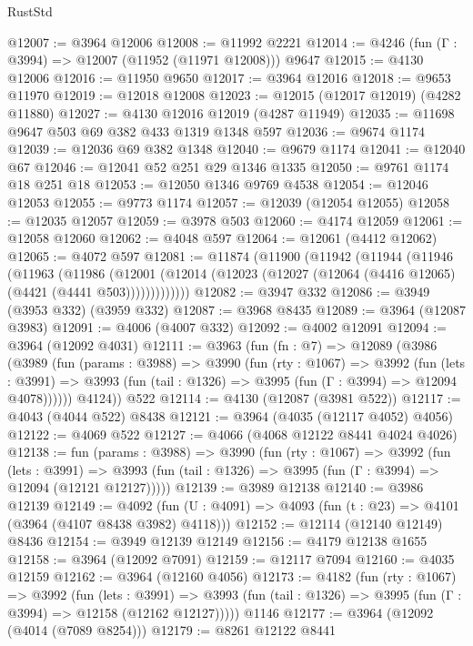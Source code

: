 \begin{lexlean}{RustStd}
\begin{coremodule}
@12007 := @3964 @12006
@12008 := @11992 @2221
@12014 := @4246 (fun (Γ : @3994) => @12007 (@11952 (@11971 @12008))) @9647
@12015 := @4130 @12006
@12016 := @11950 @9650
@12017 := @3964 @12016
@12018 := @9653 @11970
@12019 := @12018 @12008
@12023 := @12015 (@12017 @12019) (@4282 @11880)
@12027 := @4130 @12016 @12019 (@4287 @11949)
@12035 := @11698 @9647 @503 @69 @382 @433 @1319 @1348 @597
@12036 := @9674 @1174
@12039 := @12036 @69 @382 @1348
@12040 := @9679 @1174
@12041 := @12040 @67
@12046 := @12041 @52 @251 @29 @1346 @1335
@12050 := @9761 @1174 @18 @251 @18
@12053 := @12050 @1346 @9769 @4538
@12054 := @12046 @12053
@12055 := @9773 @1174
@12057 := @12039 (@12054 @12055)
@12058 := @12035 @12057
@12059 := @3978 @503
@12060 := @4174 @12059
@12061 := @12058 @12060
@12062 := @4048 @597
@12064 := @12061 (@4412 @12062)
@12065 := @4072 @597
@12081 := @11874
    (@11900
      (@11942
        (@11944
          (@11946
            (@11963
              (@11986
                (@12001
                  (@12014 (@12023 (@12027 (@12064 (@4416 @12065) (@4421 (@4441 @503)))))))))))))
@12082 := @3947 @332
@12086 := @3949 (@3953 @332) (@3959 @332)
@12087 := @3968 @8435
@12089 := @3964 (@12087 @3983)
@12091 := @4006 (@4007 @332)
@12092 := @4002 @12091
@12094 := @3964 (@12092 @4031)
@12111 := @3963
    (fun (fn : @7) =>
    @12089
      (@3986
        (@3989
          (fun (params : @3988) =>
          @3990
            (fun (rty : @1067) =>
            @3992
              (fun (lets : @3991) =>
              @3993 (fun (tail : @1326) => @3995 (fun (Γ : @3994) => @12094 @4078))))))
        @4124))
    @522
@12114 := @4130 (@12087 (@3981 @522))
@12117 := @4043 (@4044 @522) @8438
@12121 := @3964 (@4035 (@12117 @4052) @4056)
@12122 := @4069 @522
@12127 := @4066 (@4068 @12122 @8441 @4024 @4026)
@12138 := fun (params : @3988) =>
  @3990
    (fun (rty : @1067) =>
    @3992
      (fun (lets : @3991) =>
      @3993 (fun (tail : @1326) => @3995 (fun (Γ : @3994) => @12094 (@12121 @12127)))))
@12139 := @3989 @12138
@12140 := @3986 @12139
@12149 := @4092
    (fun (U : @4091) => @4093 (fun (t : @23) => @4101 (@3964 (@4107 @8438 @3982) @4118)))
@12152 := @12114 (@12140 @12149) @8436
@12154 := @3949 @12139 @12149
@12156 := @4179 @12138 @1655
@12158 := @3964 (@12092 @7091)
@12159 := @12117 @7094
@12160 := @4035 @12159
@12162 := @3964 (@12160 @4056)
@12173 := @4182
    (fun (rty : @1067) =>
    @3992
      (fun (lets : @3991) =>
      @3993 (fun (tail : @1326) => @3995 (fun (Γ : @3994) => @12158 (@12162 @12127)))))
    @1146
@12177 := @3964 (@12092 (@4014 (@7089 @8254)))
@12179 := @8261 @12122 @8441

\end{coremodule}
\end{lexlean}
